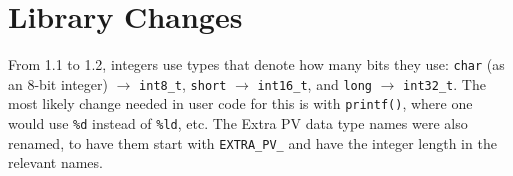 \documentclass[10pt,letterpaper]{article}
\begin{document}
\section{Library Changes}

From 1.1 to 1.2, integers use types that denote how many bits they
use: \verb+char+ (as an 8-bit integer) $\rightarrow$ \verb+int8_t+,
\verb+short+ $\rightarrow$ \verb+int16_t+, and \verb+long+
$\rightarrow$ \verb+int32_t+.  The most likely change needed in user
code for this is with \verb+printf()+, where one would use \verb+%d+
instead of \verb+%ld+, etc.  The Extra PV data type names were also
renamed, to have them start with \verb+EXTRA_PV_+ and have the integer
length in the relevant names.
\end{document}
